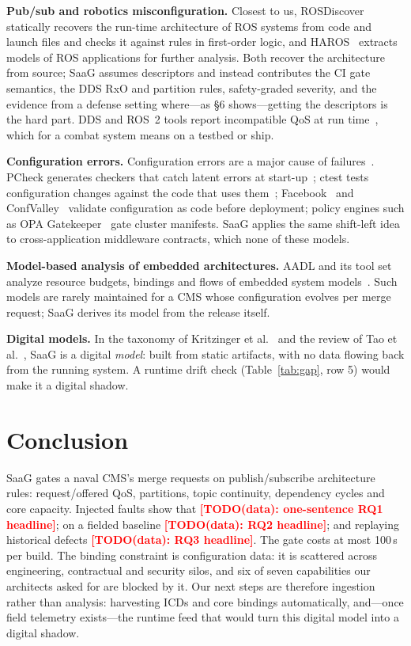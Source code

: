 \documentclass[sigconf,screen]{acmart}
\newcommand{\TODOdata}[1]{\textcolor{red}{\textbf{[TODO(data): #1]}}}
\begin{document}
\noindent\textbf{Pub/sub and robotics misconfiguration.} Closest to us, ROSDiscover~\cite{timperley2022rosdiscover} statically recovers the run-time architecture of ROS systems from code and launch files and checks it against rules in first-order logic, and HAROS~\cite{santos2021haros} extracts models of ROS applications for further analysis. Both recover the architecture from source; SaaG assumes descriptors and instead contributes the CI gate semantics, the DDS RxO and partition rules, safety-graded severity, and the evidence from a defense setting where---as \S6 shows---getting the descriptors is the hard part. DDS and ROS~2 tools report incompatible QoS at run time~\cite{omg2015dds}, which for a combat system means on a testbed or ship.

\noindent\textbf{Configuration errors.} Configuration errors are a major cause of failures~\cite{xu2015}. PCheck generates checkers that catch latent errors at start-up~\cite{xu2016pcheck}; ctest tests configuration changes against the code that uses them~\cite{sun2020ctest}; Facebook~\cite{tang2015} and ConfValley~\cite{huang2015} validate configuration as code before deployment; policy engines such as OPA Gatekeeper~\cite{gatekeeper} gate cluster manifests. SaaG applies the same shift-left idea to cross-application middleware contracts, which none of these models.

\noindent\textbf{Model-based analysis of embedded architectures.} AADL and its tool set analyze resource budgets, bindings and flows of embedded system models~\cite{feiler2012aadl}. Such models are rarely maintained for a CMS whose configuration evolves per merge request; SaaG derives its model from the release itself.

\noindent\textbf{Digital models.} In the taxonomy of Kritzinger et al.~\cite{kritzinger2018} and the review of Tao et al.~\cite{tao2019digital}, SaaG is a digital \emph{model}: built from static artifacts, with no data flowing back from the running system. A runtime drift check (Table~\ref{tab:gap}, row 5) would make it a digital shadow.

\section{Conclusion}

SaaG gates a naval CMS's merge requests on publish/subscribe architecture rules: request/offered QoS, partitions, topic continuity, dependency cycles and core capacity. Injected faults show that \TODOdata{one-sentence RQ1 headline}; on a fielded baseline \TODOdata{RQ2 headline}; and replaying historical defects \TODOdata{RQ3 headline}. The gate costs at most 100\,s per build. The binding constraint is configuration data: it is scattered across engineering, contractual and security silos, and six of seven capabilities our architects asked for are blocked by it. Our next steps are therefore ingestion rather than analysis: harvesting ICDs and core bindings automatically, and---once field telemetry exists---the runtime feed that would turn this digital model into a digital shadow.
\end{document}
